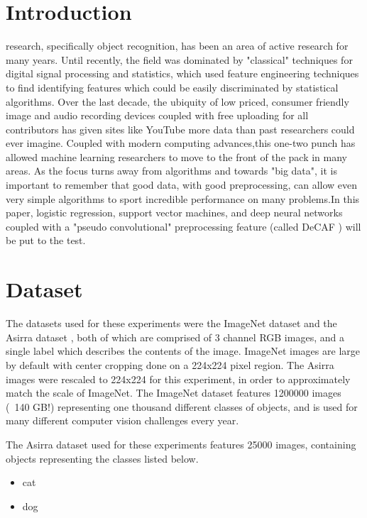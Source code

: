 \documentclass[journal]{IEEEtran}
\begin{document}
\section{Introduction}
 research, specifically object recognition, has been an 
area of active research for many years. Until recently, the field was dominated
by "classical" techniques for digital signal processing and statistics, which
used feature engineering techniques to find identifying features which could
be easily discriminated by statistical algorithms. Over the last decade, 
the ubiquity of low priced, consumer friendly image and audio recording devices
coupled with free uploading for all contributors has given sites like
YouTube more data than past researchers could ever imagine. 
Coupled with modern computing advances,this one-two punch has allowed machine
learning researchers to move to the front of the pack in many areas. As the
focus turns away from algorithms and towards "big data", it is important 
to remember that good data, with good preprocessing, can allow even very simple
algorithms to sport incredible performance on many problems.In this paper,
logistic regression, support vector machines, and deep neural networks coupled
with a "pseudo convolutional" preprocessing feature (called DeCAF \cite{DeCAF})
will be put to the test.

\section{Dataset}
The datasets used for these experiments were the ImageNet dataset 
\cite{ImageNet}\cite{TorontoImageNet}
and the Asirra dataset \cite{Asirra}, both of which are comprised of 3 channel
RGB images, and a single label which describes the contents of the image.
ImageNet images are large by default with center cropping done on a 224x224 
pixel region. The Asirra images were rescaled to 224x224 for this experiment,
in order to approximately match the scale of ImageNet.
The ImageNet dataset features 1200000 images (~140 GB!) representing 
one thousand different classes of objects, and is used for many different 
computer vision challenges every year.

The Asirra dataset used for these experiments features 25000 images, containing
objects representing the classes listed below.
\begin{itemize}
\item cat
\item dog
\end{itemize}
\end{document}
